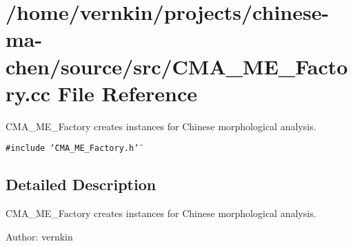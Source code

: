 \section{/home/vernkin/projects/chinese-ma-chen/source/src/CMA\_\-ME\_\-Factory.cc File Reference}
\label{CMA__ME__Factory_8cc}
CMA\_\-ME\_\-Factory creates instances for Chinese morphological analysis.  


{\tt \#include \char`\"{}CMA\_\-ME\_\-Factory.h\char`\"{}}\par


\subsection{Detailed Description}
CMA\_\-ME\_\-Factory creates instances for Chinese morphological analysis. 

\begin{Desc}
\item[Author:]vernkin \end{Desc}
